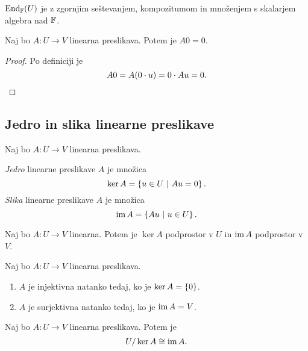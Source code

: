 \documentclass[12pt, a4paper]{article}
\begin{document}
\begin{posledica}
$\text{End}_{\mathbb{F}}(U)$ je z zgornjim seštevanjem, kompozitumom in množenjem s skalarjem algebra nad $\mathbb{F}$.
\end{posledica}

\begin{trditev}
Naj bo $A\colon U\to V$ linearna preslikava. Potem je $A0=0$.
\end{trditev}

\begin{proof}
Po definiciji je
\[
A0=A(0\cdot u)=0\cdot Au=0.\qedhere
\]
\end{proof}

\newpage

\subsection{Jedro in slika linearne preslikave}

\begin{okvir}
\begin{definicija}
Naj bo $A\colon U\to V$ linearna preslikava.

\emph{Jedro} linearne preslikave $A$ je množica
\[
\ker A=\left\{u\in U~\middle\vert~Au=0\right\}.
\]
\emph{Slika} linearne preslikave $A$ je množica
\[
\operatorname{im} A=\left\{Au~\middle\vert~u\in U\right\}.
\]
\end{definicija}
\end{okvir}

\begin{izrek}
Naj bo $A\colon U\to V$ linearna. Potem je $\ker A$ podprostor v $U$ in $\operatorname{im} A$ podprostor v $V$.
\end{izrek}

\obvs

\begin{trditev}
Naj bo $A\colon U\to V$ linearna preslikava.

\begin{enumerate}[label=\roman*)]
\item $A$ je injektivna natanko tedaj, ko je $\ker A=\left\{0\right\}$.
\item $A$ je surjektivna natanko tedaj, ko je $\operatorname{im} A=V$.
\end{enumerate}
\end{trditev}

\obvs

\begin{izrek}\label{izo1}
Naj bo $A\colon U\to V$ linearna preslikava. Potem je
\[
U/\ker A\cong\operatorname{im} A.
\]
\end{izrek}
\end{document}
